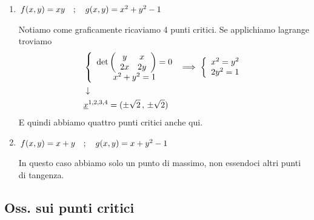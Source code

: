 \begin{enumerate}
	\item $f(x,y)=xy \quad ; \quad g(x,y)=x^2 + y^2 -1$
	\begin{figure}[!htb]
	\end{figure}	
	Notiamo come graficamente ricaviamo 4 punti critici.
	Se applichiamo lagrange troviamo
	\begin{align}
		{}&\left\{\begin{array}{cc} \det \left( \begin{array}{ccc} y & x \\ 2x & 2y \end{array} \right)=0 \\ x^2 + y^2 =1 \end{array}\right. \implies \left\{\begin{array}{cc} x^2 = y^2 \\ 2y^2=1 \end{array}\right.\nonumber \\ &\downarrow \nonumber \\ &\underline{x}^{1,2,3,4}=(\pm \sqrt{2} \, , \,\pm \sqrt{2})
	\end{align}
	E quindi abbiamo quattro punti critici anche qui.
	\item $f(x,y)=x+y \quad ; \quad g(x,y)=x + y^2 -1$
	\begin{figure}[!htb]
	\end{figure}
	
	
	In questo caso abbiamo solo un punto di massimo, non essendoci altri punti di tangenza. 
\end{enumerate}

\newpage

\subsection{Oss. sui punti critici}

